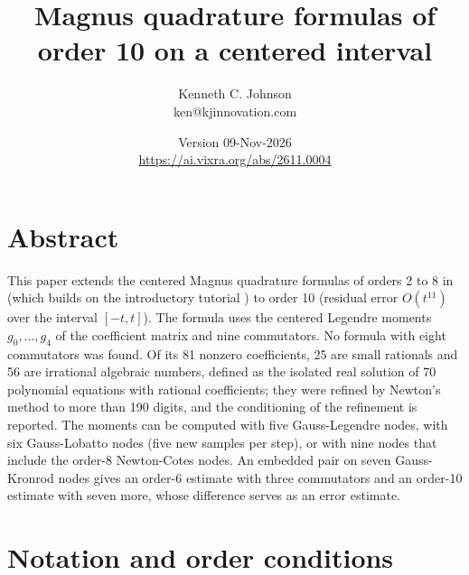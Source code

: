 \documentclass[12pt]{article}
\title{Magnus quadrature formulas of order 10 on a centered interval}
\author{Kenneth C. Johnson\\ \normalsize ken@kjinnovation.com}
\date{Version 09-Nov-2026\\ \url{https://ai.vixra.org/abs/2611.0004}}
\begin{document}
\maketitle

\section*{Abstract}

\noindent This paper extends the centered Magnus quadrature formulas of orders 2 to 8 in \cite{j28} (which builds on the introductory tutorial \cite{jtut}) to order 10 (residual error $O(t^{11})$ over the interval $[-t,t]$). The formula uses the centered Legendre moments $g_0,\ldots,g_4$ of the coefficient matrix and nine commutators. No formula with eight commutators was found. Of its 81 nonzero coefficients, 25 are small rationals and 56 are irrational algebraic numbers, defined as the isolated real solution of 70 polynomial equations with rational coefficients; they were refined by Newton's method to more than 190 digits, and the conditioning of the refinement is reported. The moments can be computed with five Gauss-Legendre nodes, with six Gauss-Lobatto nodes (five new samples per step), or with nine nodes that include the order-8 Newton-Cotes nodes. An embedded pair on seven Gauss-Kronrod nodes gives an order-6 estimate with three commutators and an order-10 estimate with seven more, whose difference serves as an error estimate.

\section*{Notation and order conditions}
\end{document}
